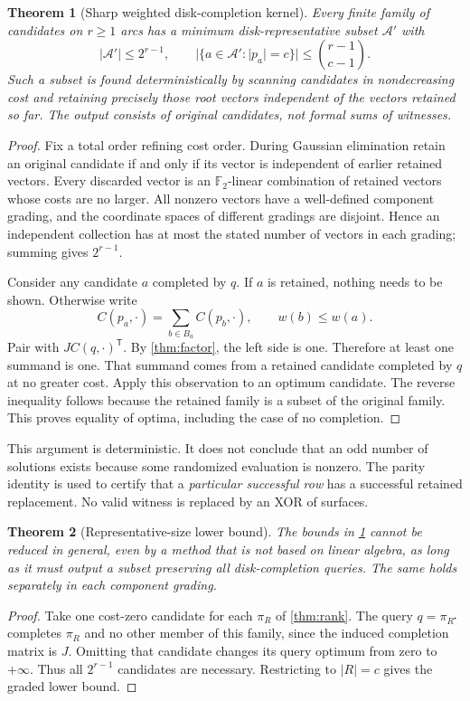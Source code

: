\documentclass[11pt,a4paper]{article}
\newtheorem{theorem}{Theorem}[section]
\theoremstyle{definition}
\theoremstyle{remark}
\newcommand{\F}{\mathbb F_2}
\begin{document}
\begin{theorem}[Sharp weighted disk-completion kernel]\label{thm:weighted}
Every finite family of candidates on $r\ge1$ arcs has a minimum disk-representative
subset $\mathcal A'$ with
\[
 |\mathcal A'|\le2^{r-1},\qquad
 |\{a\in\mathcal A':|p_a|=c\}|\le\binom{r-1}{c-1}.
\]
Such a subset is found deterministically by scanning candidates in nondecreasing cost
and retaining precisely those root vectors independent of the vectors retained so far.
The output consists of original candidates, not formal sums of witnesses.
\end{theorem}
\begin{proof}
Fix a total order refining cost order. During Gaussian elimination retain an original
candidate if and only if its vector is independent of earlier retained vectors. Every
discarded vector is an $\F$-linear combination of retained vectors whose costs are
no larger. All nonzero vectors have a well-defined component grading, and the
coordinate spaces of different gradings are disjoint. Hence an independent collection
has at most the stated number of vectors in each grading; summing gives $2^{r-1}$.

Consider any candidate $a$ completed by $q$. If $a$ is retained, nothing needs to be
shown. Otherwise write
\[
 C(p_a,\cdot)=\sum_{b\in B_a}C(p_b,\cdot),\qquad
                         w(b)\le w(a).
\]
Pair with $JC(q,\cdot)^{\mathsf T}$. By \cref{thm:factor}, the left side is one.
Therefore at least one summand is one. That summand comes from a retained candidate
completed by $q$ at no greater cost. Apply this observation to an optimum candidate.
The reverse inequality follows because the retained family is a subset of the original
family. This proves equality of optima, including the case of no completion.
\end{proof}

This argument is deterministic. It does not conclude that an odd number of solutions
exists because some randomized evaluation is nonzero. The parity identity is used to
certify that a \emph{particular successful row} has a successful retained replacement.
No valid witness is replaced by an XOR of surfaces.

\begin{theorem}[Representative-size lower bound]\label{thm:lower}
The bounds in \cref{thm:weighted} cannot be reduced in general, even by a method
that is not based on linear algebra, as long as it must output a subset preserving all
disk-completion queries. The same holds separately in each component grading.
\end{theorem}
\begin{proof}
Take one cost-zero candidate for each $\pi_R$ of \cref{thm:rank}.
The query $q=\pi_{R^\star}$ completes $\pi_R$ and no other member of this
family, since the induced completion matrix is $J$. Omitting that candidate changes
its query optimum from zero to $+\infty$. Thus all $2^{r-1}$ candidates are
necessary. Restricting to $|R|=c$ gives the graded lower bound.
\end{proof}
\end{document}
